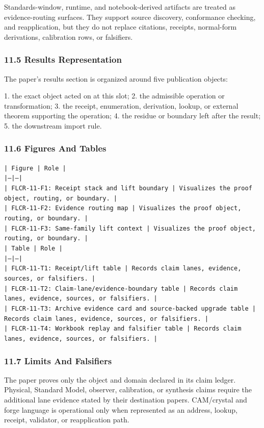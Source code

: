 \documentclass[11pt]{article}
\begin{document}
Standards-window, runtime, and notebook-derived artifacts are treated
as evidence-routing surfaces. They support source discovery, conformance
checking, and reapplication, but they do not replace citations, receipts,
normal-form derivations, calibration rows, or falsifiers.

\subsubsection*{11.5 Results Representation}

The paper's results section is organized around five publication objects:

1. the exact object acted on at this slot;
2. the admissible operation or transformation;
3. the receipt, enumeration, derivation, lookup, or external theorem supporting
   the operation;
4. the residue or boundary left after the result;
5. the downstream import rule.

\subsubsection*{11.6 Figures And Tables}

\noindent\texttt{| Figure | Role |}\\
\noindent\texttt{|---|---|}\\
\noindent\texttt{| FLCR-11-F1: Receipt stack and lift boundary | Visualizes the proof object, routing, or boundary. |}\\
\noindent\texttt{| FLCR-11-F2: Evidence routing map | Visualizes the proof object, routing, or boundary. |}\\
\noindent\texttt{| FLCR-11-F3: Same-family lift context | Visualizes the proof object, routing, or boundary. |}\\

\noindent\texttt{| Table | Role |}\\
\noindent\texttt{|---|---|}\\
\noindent\texttt{| FLCR-11-T1: Receipt/lift table | Records claim lanes, evidence, sources, or falsifiers. |}\\
\noindent\texttt{| FLCR-11-T2: Claim-lane/evidence-boundary table | Records claim lanes, evidence, sources, or falsifiers. |}\\
\noindent\texttt{| FLCR-11-T3: Archive evidence card and source-backed upgrade table | Records claim lanes, evidence, sources, or falsifiers. |}\\
\noindent\texttt{| FLCR-11-T4: Workbook replay and falsifier table | Records claim lanes, evidence, sources, or falsifiers. |}\\

\subsubsection*{11.7 Limits And Falsifiers}

The paper proves only the object and domain declared in its claim ledger.
Physical, Standard Model, observer, calibration, or synthesis claims require
the additional lane evidence stated by their destination papers. CAM/crystal
and forge language is operational only when represented as an address, lookup,
receipt, validator, or reapplication path.
\end{document}
